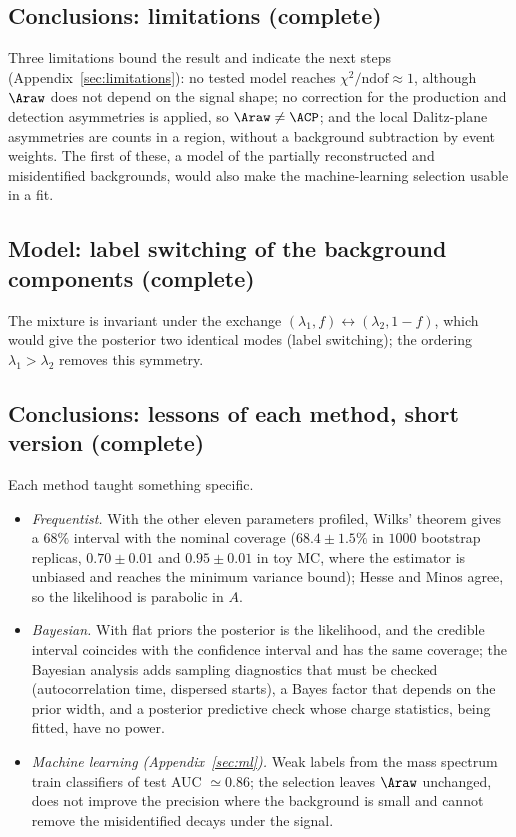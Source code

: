 \subsection{Conclusions: limitations (complete)}
Three limitations bound the result and indicate the next steps (Appendix~\ref{sec:limitations}): no tested model reaches $\chi^2/\mathrm{ndof}\approx1$, although $\Araw$ does not depend on the signal shape; no correction for the production and detection asymmetries is applied, so $\Araw\neq\ACP$; and the local Dalitz-plane asymmetries are counts in a region, without a background subtraction by event weights. The first of these, a model of the partially reconstructed and misidentified backgrounds, would also make the machine-learning selection usable in a fit.

\subsection{Model: label switching of the background components (complete)}
The mixture is invariant under the exchange $(\lambda_1,f)\leftrightarrow(\lambda_2,1-f)$, which would give the posterior two identical modes (label switching); the ordering $\lambda_1>\lambda_2$ removes this symmetry.

\subsection{Conclusions: lessons of each method, short version (complete)}
Each method taught something specific.
\begin{itemize}[leftmargin=*,itemsep=2pt]
\item \emph{Frequentist.} With the other eleven parameters profiled, Wilks' theorem gives a $68\%$ interval with the nominal coverage ($68.4\pm1.5\%$ in $1000$ bootstrap replicas, $0.70\pm0.01$ and $0.95\pm0.01$ in toy MC, where the estimator is unbiased and reaches the minimum variance bound); Hesse and Minos agree, so the likelihood is parabolic in $A$.
\item \emph{Bayesian.} With flat priors the posterior is the likelihood, and the credible interval coincides with the confidence interval and has the same coverage; the Bayesian analysis adds sampling diagnostics that must be checked (autocorrelation time, dispersed starts), a Bayes factor that depends on the prior width, and a posterior predictive check whose charge statistics, being fitted, have no power.
\item \emph{Machine learning (Appendix~\ref{sec:ml}).} Weak labels from the mass spectrum train classifiers of test AUC $\simeq0.86$; the selection leaves $\Araw$ unchanged, does not improve the precision where the background is small and cannot remove the misidentified decays under the signal.
\end{itemize}

